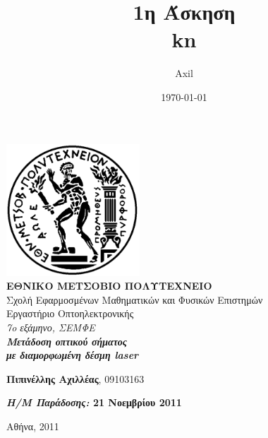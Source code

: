 \documentclass[a4paper,11pt,titlepage]{article}
\title{1η Άσκηση\\kn}
\author{Axil}
\date{\today}
\begin{document}
\pagestyle{headings}    %

\begin{titlepage}
\begin{center}
\includegraphics[width=50mm]{pyrforos.pdf}\\[0.5cm]
\textbf{\LARGE ΕΘΝΙΚΟ ΜΕΤΣΟΒΙΟ ΠΟΛΥΤΕΧΝΕΙΟ}\\
\textrm{\Large Σχολή Εφαρμοσμένων Μαθηματικών και Φυσικών Επιστημών}\\[2.0cm]
\Huge{Εργαστήριο Οπτοηλεκτρονικής}\\
\Large{\textit{7o εξάμηνο, ΣΕΜΦΕ}}\\[2.0cm]
\Large{\textit{\textbf{Μετάδοση οπτικού σήματος\\ με διαμορφωμένη δέσμη laser}}}\\[5.0cm]
\normalsize
\begin{minipage}{0.49\textwidth}
\begin{flushleft}
\textbf{Πιπινέλλης Αχιλλέας}, 09103163
\end{flushleft}
\end{minipage}
\begin{minipage}{0.49\textwidth}
\begin{flushright}
\textbf{\textit{Η/Μ Παράδοσης:} 21 Νοεμβρίου 2011}
\end{flushright}
\end{minipage}

\vfill
{Αθήνα, 2011}

\end{center}
\end{titlepage}
\end{document}
